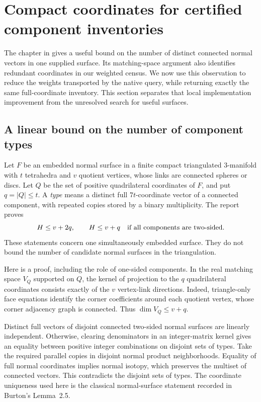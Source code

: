 \section{Compact coordinates for certified component inventories}
\label{sec:compact-coordinates}

The chapter in
 gives a useful
bound on the number of distinct connected normal vectors in one supplied
surface. Its matching-space argument also identifies redundant coordinates
in our weighted census. We now use this observation to reduce the weights
transported by the native  query, while returning exactly
the same full-coordinate inventory. This section separates that local
implementation improvement from the unresolved search for useful surfaces.

\subsection{A linear bound on the number of component types}

Let $F$ be an embedded normal surface in a finite compact triangulated
3-manifold with $t$ tetrahedra and $v$ quotient vertices, whose links are
connected spheres or discs. Let $Q$ be the set of positive quadrilateral
coordinates of $F$, and put $q=|Q|\le t$. A \emph{type} means a distinct
full $7t$-coordinate vector of a connected component, with repeated copies
stored by a binary multiplicity. The report proves
\[
 H\le v+2q,\qquad
 H\le v+q\quad\hbox{if all components are two-sided}.
\]
These statements concern one simultaneously embedded surface. They do not
bound the number of candidate normal surfaces in the triangulation.

Here is a proof, including the role of one-sided components. In the real
matching space $V_Q$ supported on $Q$, the kernel of projection to the $q$
quadrilateral coordinates consists exactly of the $v$ vertex-link directions.
Indeed, triangle-only face equations identify the corner coefficients around
each quotient vertex, whose corner adjacency graph is connected. Thus
$\dim V_Q\le v+q$.

Distinct full vectors of disjoint connected two-sided normal surfaces are
linearly independent. Otherwise, clearing denominators in an integer-matrix
kernel gives an equality between positive integer combinations on disjoint
sets of types. Take the required parallel copies in disjoint normal product
neighborhoods. Equality of full normal coordinates implies normal isotopy,
which preserves the multiset of connected vectors. This contradicts the
disjoint sets of types. The coordinate uniqueness used here is the classical
normal-surface statement recorded in Burton's Lemma~2.5\cite{burton-convert}.

